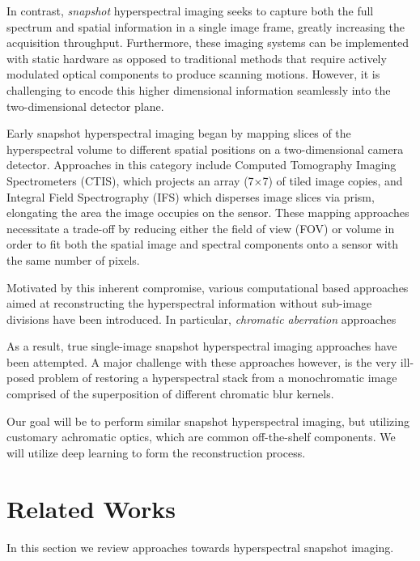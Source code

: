 \documentclass{article}
\begin{document}
In contrast, \textit{snapshot} hyperspectral imaging seeks to capture both the full spectrum and spatial information in a single image frame, greatly increasing the acquisition throughput. Furthermore, these imaging systems can be implemented with static hardware as opposed to traditional methods that require actively modulated optical components to produce scanning motions. However, it is challenging to encode this higher dimensional information seamlessly into the two-dimensional detector plane. 

Early snapshot hyperspectral imaging began by mapping slices of the hyperspectral volume to different spatial positions on a two-dimensional camera detector. Approaches in this category include Computed Tomography Imaging Spectrometers (CTIS), which projects an array (7×7) of tiled image copies, and Integral Field Spectrography (IFS) which disperses image slices via prism, elongating the area the image occupies on the sensor. These mapping approaches necessitate a trade-off by reducing either the field of view (FOV) or volume in order to fit both the spatial image and spectral components onto a sensor with the same number of pixels.

Motivated by this inherent compromise, various computational based approaches aimed at reconstructing the hyperspectral information without sub-image divisions have been introduced. In particular, \textit{chromatic aberration} approaches  


As a result, true single-image snapshot hyperspectral imaging approaches have been attempted. A major challenge with these approaches however, is the very ill-posed problem of restoring a hyperspectral stack from a monochromatic image comprised of the superposition of different chromatic blur kernels. 

Our goal will be to perform similar snapshot hyperspectral imaging, but utilizing customary achromatic optics, which are common off-the-shelf components. We will utilize deep learning to form the reconstruction process.


\section{Related Works}
In this section we review approaches towards hyperspectral snapshot imaging.
\end{document}
